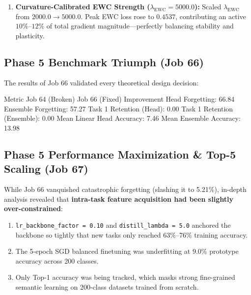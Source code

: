 \documentclass[11pt,a4paper]{article}
\begin{document}
\begin{enumerate}[leftmargin=*]
        \begin{equation}
            \mathcal{M}_{k, c} \leftarrow \text{KMeans}(E_t(X_c)).
        \end{equation}
        This completely eliminated representation drift: prototypes and live features always share identical coordinate geometry.
        \item \textbf{Curvature-Calibrated EWC Strength ($\lambda_{\text{EWC}} = 5000.0$):}
        Scaled $\lambda_{\text{EWC}}$ from $2000.0 \to 5000.0$. Peak EWC loss rose to $0.4537$, contributing an active $10\%$--$12\%$ of total gradient magnitude---perfectly balancing stability and plasticity.
    \end{enumerate}

    \subsection{Phase 5 Benchmark Triumph (Job 66)}
    The results of Job 66 validated every theoretical design decision:

    \begin{diagrambox}
    Metric                      Job 64 (Broken)       Job 66 (Fixed)        Improvement
    Head Forgetting:                 66.84%
    Ensemble Forgetting:             57.27%
    Task 1 Retention (Head):          0.00%
    Task 1 Retention (Ensemble):      0.00%
    Mean Linear Head Accuracy:        7.46%
    Mean Ensemble Accuracy:          13.98%
    \end{diagrambox}

    \subsection{Phase 5 Performance Maximization \& Top-5 Scaling (Job 67)}
    While Job 66 vanquished catastrophic forgetting (slashing it to 5.21\%), in-depth analysis revealed that \textbf{intra-task feature acquisition had been slightly over-constrained}:
    \begin{enumerate}[leftmargin=*]
        \item \texttt{lr\_backbone\_factor = 0.10} and \texttt{distill\_lambda = 5.0} anchored the backbone so tightly that new tasks only reached 63\%--76\% training accuracy.
        \item The 5-epoch SGD balanced finetuning was underfitting at 9.0\% prototype accuracy across 200 classes.
        \item Only Top-1 accuracy was being tracked, which masks strong fine-grained semantic learning on 200-class datasets trained from scratch.
    \end{enumerate}
\end{document}
